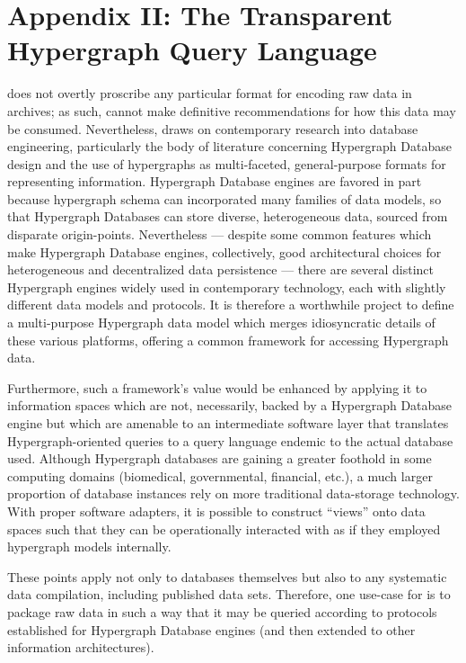 \documentclass[11pt,letterpaper]{article}
\newcommand{\ATexttclr}[1]{\textcolor{tcolor}{\textbf{#1}}}
\newcommand{\lSDRF}{\resizebox{!}{8pt}{\ATexttclr{S}}\resizebox{!}{8pt}{\ATexttclr{DR%
\hspace{1pt}{\raisebox{-.5pt}{\fontfamily{qhv}\fontseries{b}\selectfont{}\Large{F}}%
}}}}
\newcommand{\SDRF}{\resizebox{!}{8pt}{\ATexttclr{S}}\resizebox{!}{8pt}{\ATexttclr{DR%
\hspace{1pt}{\raisebox{-1pt}{\fontfamily{qhv}\fontseries{b}\selectfont{}\Large{F}}%
}}}}
\newcommand{\p}[1]{

\vspace{.7em}#1}
\newcommand{\q}[1]{{\fontfamily{qcr}\selectfont ``}#1{\fontfamily{qcr}\selectfont ''}}
\begin{document}
{\section{Appendix II: The Transparent Hypergraph Query Language}
\p{\lSDRF{} does not overtly proscribe any particular 
format for encoding raw data in \SDRF{} archives; 
as such, \SDRF{} cannot make definitive recommendations 
for how this data may be consumed.  Nevertheless, 
\SDRF{} draws on contemporary research into database 
engineering, particularly the body of literature 
concerning Hypergraph Database design and the 
use of hypergraphs as multi-faceted, general-purpose 
formats for representing information.  Hypergraph 
Database engines are favored in part because hypergraph 
schema can incorporated many families of data models, 
so that Hypergraph Databases can store diverse, heterogeneous 
data, sourced from disparate origin-points.  
Nevertheless --- despite some common features which make Hypergraph Database 
engines, collectively, good architectural choices 
for heterogeneous and decentralized data persistence ---  
there are several distinct Hypergraph engines 
widely used in contemporary technology, each with slightly 
different data models and protocols.  It is therefore a 
worthwhile project to define a multi-purpose Hypergraph data 
model which merges idiosyncratic details of 
these various platforms, offering a common framework for 
accessing Hypergraph data.}

\p{Furthermore, such a framework's value would 
be enhanced by applying it to information spaces which 
are not, necessarily, backed by a Hypergraph Database engine 
but which are amenable to an intermediate software layer that 
translates Hypergraph-oriented queries to a query language 
endemic to the actual database used.  Although Hypergraph databases 
are gaining a greater foothold in some computing domains 
(biomedical, governmental, financial, etc.), a much larger 
proportion of database instances rely on more traditional 
data-storage technology.   With proper software 
adapters, it is possible to construct \q{views} onto 
data spaces such that they can be operationally interacted 
with as if they employed hypergraph models internally.}

\p{These points apply not only to databases themselves 
but also to any systematic data compilation, including 
published data sets.  Therefore, one use-case for 
\SDRF{} is to package raw data in such a way that 
it may be queried according to protocols established 
for Hypergraph Database engines (and then extended 
to other information architectures).}

}
\end{document}
